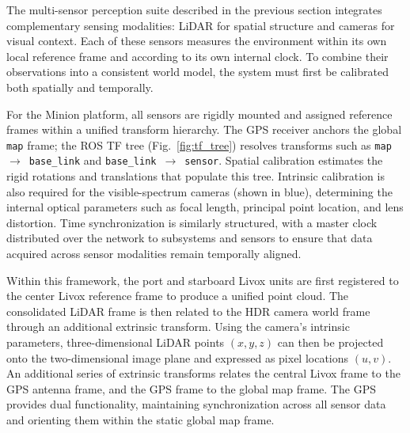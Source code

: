\documentclass[../main.tex]{subfiles}
\begin{document}

The multi-sensor perception suite described in the previous section integrates complementary sensing modalities: \ac{LiDAR} for spatial structure and cameras for visual context.
Each of these sensors measures the environment within its own local reference frame and according to its own internal clock.
To combine their observations into a consistent world model, the system must first be calibrated both spatially and temporally.

For the Minion platform, all sensors are rigidly mounted and assigned reference frames within a unified transform hierarchy. 
The GPS receiver anchors the global \texttt{map} frame; the ROS TF tree (Fig.~\ref{fig:tf_tree}) resolves transforms such as \texttt{map}\ $\rightarrow$\ \texttt{base\_link} and \texttt{base\_link}\ $\rightarrow$\ \texttt{sensor}. Spatial calibration estimates the rigid rotations and translations that populate this tree.  
Intrinsic calibration is also required for the visible-spectrum cameras (shown in blue), determining the internal optical parameters such as focal length, principal point location, and lens distortion. 
Time synchronization is similarly structured, with a master clock distributed over the network to subsystems and sensors to ensure that data acquired across sensor modalities remain temporally aligned.

Within this framework, the port and starboard Livox units are first registered to the center Livox reference frame to produce a unified point cloud. 
The consolidated LiDAR frame is then related to the HDR camera world frame through an additional extrinsic transform. 
Using the camera’s intrinsic parameters, three-dimensional LiDAR points $(x, y, z)$ can then be projected onto the two-dimensional image plane and expressed as pixel locations $(u, v)$. 
An additional series of extrinsic transforms relates the central Livox frame to the \ac{GPS} antenna frame, and the \ac{GPS} frame to the global map frame. 
The \ac{GPS} provides dual functionality, maintaining synchronization across all sensor data and orienting them within the static global map frame.
\end{document}
